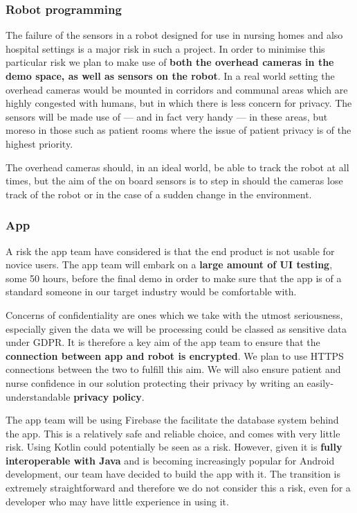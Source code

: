 \documentclass{article}
\begin{document}
\subsubsection{Robot programming}

The failure of the sensors in a robot designed for use in nursing homes and also hospital settings is a major risk in such a project. In order to minimise this particular risk we plan to make use of {\bf both the overhead cameras in the demo space, as well as sensors on the robot}. In a real world setting the overhead cameras would be mounted in corridors and communal areas which are highly congested with humans, but in which there is less concern for privacy. The sensors will be made use of --- and in fact very handy --- in these areas, but moreso in those such as patient rooms where the issue of patient privacy is of the highest priority.

The overhead cameras should, in an ideal world, be able to track the robot at all times, but the aim of the on board sensors is to step in should the cameras lose track of the robot or in the case of a sudden change in the environment.

\subsubsection{App}

A risk the app team have considered is that the end product is not usable for novice users. The app team will embark on a {\bf large amount of UI testing}, some 50 hours, before the final demo in order to make sure that the app is of a standard someone in our target industry would be comfortable with.

Concerns of confidentiality are ones which we take with the utmost seriousness, especially given the data we will be processing could be classed as sensitive data under GDPR. It is therefore a key aim of the app team to ensure that the {\bf connection between app and robot is encrypted}. We plan to use HTTPS connections between the two to fulfill this aim. We will also ensure patient and nurse confidence in our solution protecting their privacy by writing an easily-understandable {\bf privacy policy}. 

The app team will be using Firebase the facilitate the database system behind the app. This is a relatively safe and reliable choice, and comes with very little risk. Using Kotlin could potentially be seen as a risk. However, given it is {\bf fully interoperable with Java} and is becoming increasingly popular for Android development, our team have decided to build the app with it. The transition is extremely straightforward and therefore we do not consider this a risk, even for a developer who may have little experience in using it.
\end{document}
